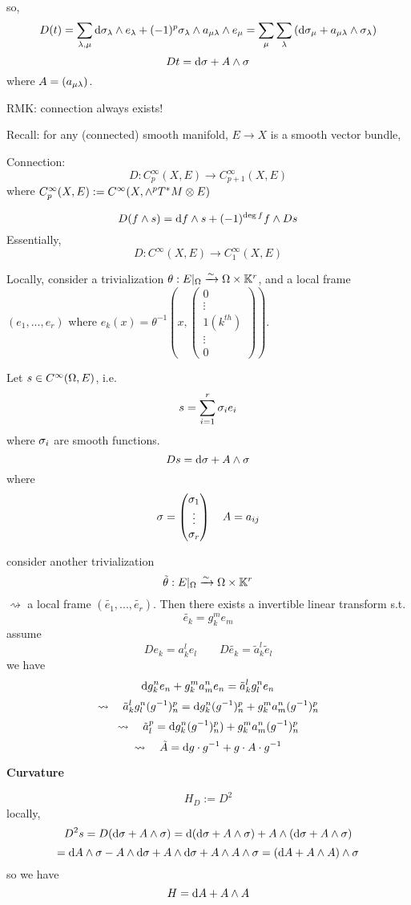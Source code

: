 so,
$$D(t)=
\sum_{\lambda,\mu}
  \mathrm{d}\sigma_{\lambda}\wedge e_{\lambda}+(-1)^p\sigma_{\lambda}\wedge a_{\mu\lambda}\wedge e_{\mu}
=\sum_{\mu}
   \sum_{\lambda}
     \left(
       \mathrm{d}\sigma_{\mu}+
       a_{\mu\lambda}\wedge\sigma_{\lambda}
     \right)$$
$$Dt=\mathrm{d}\sigma+A\wedge\sigma$$
where $A=(a_{\mu\lambda})$.

RMK: connection always exists!


Recall: for any (connected) smooth manifold,
$E\to X$ is a smooth vector bundle,

Connection:
$$D:C^\infty_p(X,E)\to C_{p+1}^\infty(X,E)$$
where $C^\infty_p(X,E):=C^\infty(X,\wedge^pT^*M\otimes E)$

$$D(f\wedge s)=\mathrm{d} f\wedge s+(-1)^{\deg f}f\wedge Ds$$
Essentially,
$$D:C^\infty(X,E)\to C_1^\infty(X,E)$$

Locally, consider a trivialization
$\theta:E|_\Omega\xrightarrow{\sim}\Omega\times \mathbb{K}^r$, and a local frame
$(e_1,...,e_r)$ where $e_k(x)=\theta^{-1}(x,\begin{pmatrix}
0\\\vdots\\1 (k^{th})\\
\vdots\\0
\end{pmatrix})$.

Let $s\in C^\infty(\Omega,E)$, i.e.
$$s=\sum_{i=1}^r\sigma_ie_i$$
where $\sigma_i$ are smooth functions.
$$Ds=\mathrm{d}\sigma+A\wedge\sigma$$
where
$$
  \sigma=
  \begin{pmatrix}
  \sigma_1\\\vdots\\\sigma_r
  \end{pmatrix}
  \quad
  A={a_{ij}}
$$

consider another trivialization
$$\tilde\theta:E|_\Omega\xrightarrow{\sim}\Omega\times\mathbb{K}^r$$
$\rightsquigarrow$ a local frame $(\tilde{e_1},...,\tilde{e_r})$.
Then there exists a invertible linear transform s.t.
$$\tilde{e_k}=g_k^me_m$$
assume
$$De_k=a_k^le_l\qquad
D\tilde{e_k}=\tilde{a}_k^l\tilde{e}_l$$
we have
$$\mathrm{d} g_k^ne_n+g_k^ma_m^ne_n=\tilde{a}_k^lg_l^ne_n$$
$$\rightsquigarrow\quad
\tilde{a}_k^lg_l^n(g^{-1})^p_n=\mathrm{d} g_k^n(g^{-1})^p_n+g_k^ma_m^n(g^{-1})^p_n$$
$$\rightsquigarrow\quad
\tilde{a}_l^p=\mathrm{d} g_k^n(g^{-1})^p_n)+g_k^ma^n_m(g^{-1})^p_n
$$
$$\rightsquigarrow\quad
\tilde{A}=\mathrm{d} g\cdot g^{-1}+g\cdot A\cdot g^{-1}$$

\textbf{Curvature}

$$H_D:=D^2$$%
locally,
$$D^2s=D(\mathrm{d}\sigma+A\wedge\sigma)=
\mathrm{d}(\mathrm{d}\sigma+A\wedge\sigma)+A\wedge(\mathrm{d}\sigma+A\wedge\sigma)$$
$$
  =\mathrm{d} A\wedge\sigma-A\wedge\mathrm{d}\sigma+A\wedge\mathrm{d}\sigma+A\wedge A\wedge\sigma
  =(\mathrm{d} A+A\wedge A)\wedge\sigma
$$
so we have
$$H=\mathrm{d} A+A\wedge A$$

